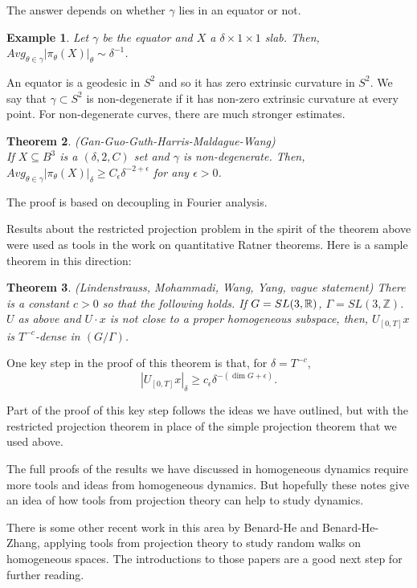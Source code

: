 \documentclass[12pt]{amsart}
\newtheorem{theorem}{Theorem}[section]
\newtheorem{example}[theorem]{Example}
\newcommand{\Z}{\mathbb{Z}}
\begin{document}
The answer depends on whether $\gamma$ lies in an equator or not. 
\begin{example}
    Let $\gamma$ be the equator and $X$ a $\delta \times 1 \times 1$ slab. Then, $Avg_{\theta \in \gamma} |\pi_\theta(X)|_\theta \sim \delta^{-1}$. 
\end{example}

An equator is a geodesic in $S^2$ and so it has zero extrinsic curvature in $S^2$.   We say that $\gamma \subset S^2$ is non-degenerate if it has non-zero extrinsic curvature at every point.  For non-degenerate curves,  there are much stronger estimates.

\begin{theorem}(Gan-Guo-Guth-Harris-Maldague-Wang)\\
    If $X \subseteq B^3$ is a $(\delta, 2, C)$ set and $\gamma$ is non-degenerate. Then, $Avg_{\theta \in \gamma}|\pi_\theta(X)|_\delta \geq C_\epsilon \delta^{-2+\epsilon}$ for any $\epsilon >0$. 
\end{theorem}

The proof is based on decoupling in Fourier analysis.

Results about the restricted projection problem in the spirit of the theorem above were used as tools in the work on quantitative Ratner theorems.  Here is a sample theorem in this direction:
\begin{theorem}(Lindenstrauss, Mohammadi, Wang, Yang,  vague statement) There is a constant $c > 0$ so that the following holds.
If $G=SL(3,\mathbb{R})$, $\Gamma=SL(3,\Z)$. $U$ as above and $U \cdot x $ is not close to a proper homogeneous subspace, then, $U_{[0,T]} x$ is $T^{-c}$-dense in $(G / \Gamma)$.
\end{theorem}

One key step in the proof of this theorem is that, for $\delta = T^{-c}$, 
$$|U_{[0,T]} x|_\delta \geq c_\epsilon \delta^{-(\dim G+\epsilon)}.$$

Part of the proof of this key step follows the ideas we have outlined, but with the restricted projection theorem in place of the simple projection theorem that we used above.

The full proofs of the results we have discussed in homogeneous dynamics require more tools and ideas from homogeneous dynamics.  But hopefully these notes give an idea of how tools from projection theory can help to study dynamics. 

There is some other recent work in this area by Benard-He and Benard-He-Zhang,  applying tools from projection theory to study random walks on homogeneous spaces.  The introductions to those papers are a good next step for further reading.
\end{document}

